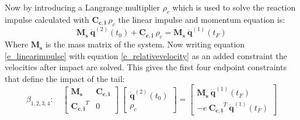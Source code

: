 Now by introducing a Langrange multiplier $\rho_c$ which is used to solve the reaction impulse calculated with $\mathbf{C_{c,i}}\ \rho_c$ the linear impulse and momentum equation is:
\begin{equation}\label{e_linearimpulse}
    \mathbf{M_s}\ \mathbf{\dot q}^{(2)}(t_0) + \mathbf{C_{c,i}}\ \rho_c = \mathbf{M_s}\ \mathbf{\dot q}^{(1)}(t_F)
\end{equation}
Where $\mathbf{M_s}$ is the mass matrix of the system. Now writing equation \ref{e_linearimpulse} with equation \ref{e_relativevelocity} as an added constraint the velocities after impact are solved. This gives the first four endpoint constraints that define the impact of the tail:
\begin{equation}
    \beta_{1,2,3,4}: \quad \left[\begin{array}{cc}
        \mathbf{M_s} & \mathbf{C_{c,i}} \\
        \mathbf{C_{c,i}}^T & 0
    \end{array} \right]\
    \left[\begin{array}{c}
       \mathbf{\dot q}^{(2)}(t_0)  \\
        \rho_c 
    \end{array}\right] = 
    \left[\begin{array}{c}
         \mathbf{M_s}\ \mathbf{\dot q}^{(1)}(t_F)   \\
         -e\ \mathbf{C_{c,i}}^T\ \mathbf{\dot q}^{(1)}(t_F)
    \end{array}\right]
\end{equation}

